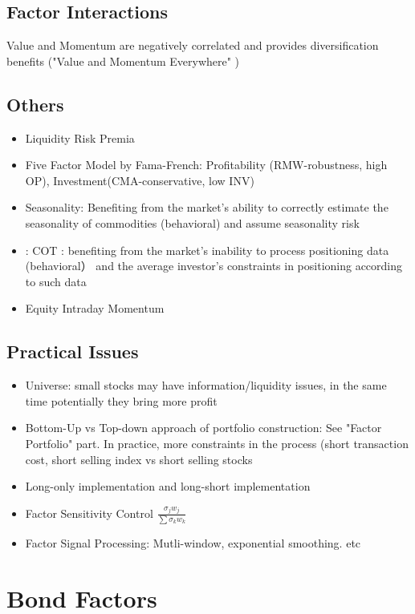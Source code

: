 \documentclass[11pt, openany]{book}              %
\begin{document}
\subsection{Factor Interactions}
Value and Momentum are negatively correlated and provides diversification benefits ("Value and Momentum Everywhere" )

\subsection{Others}
\begin{itemize}
	\item Liquidity Risk Premia 
	\item Five Factor Model by Fama-French: Profitability (RMW-robustness, high OP), Investment(CMA-conservative, low INV)
	\item Seasonality: Benefiting from the market's ability to correctly estimate the seasonality of commodities (behavioral) and assume seasonality risk
	\item: COT : benefiting from the market's inability to process positioning data (behavioral） and the average investor's constraints in positioning according to such data
	\item Equity Intraday Momentum
\end{itemize}

\subsection{Practical Issues}

\begin{itemize}
	\item Universe: small stocks may have information/liquidity issues, in the same time potentially they bring more profit
	\item Bottom-Up vs Top-down approach of portfolio construction: See "Factor Portfolio" part. In practice, more constraints in the process (short transaction cost, short selling index vs short selling stocks
	\item Long-only implementation and long-short implementation
	\item Factor Sensitivity Control $\frac{\sigma_j w_j}{\sum \sigma_k w_k}$
	\item Factor Signal Processing: Mutli-window, exponential smoothing. etc
\end{itemize}
\section{Bond Factors}
\end{document}

